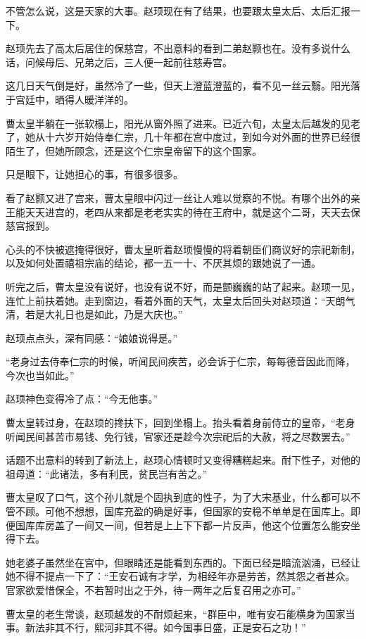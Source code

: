 不管怎么说，这是天家的大事。赵顼现在有了结果，也要跟太皇太后、太后汇报一下。

赵顼先去了高太后居住的保慈宫，不出意料的看到二弟赵颢也在。没有多说什么话，问候母后、兄弟之后，三人便一起前往慈寿宫。

这几日天气倒是好，虽然冷了一些，但天上澄蓝澄蓝的，看不见一丝云翳。阳光落于宫廷中，晒得人暖洋洋的。

曹太皇半躺在一张软榻上，阳光从窗外照了进来。已近六旬，太皇太后越发的见老了，她从十六岁开始侍奉仁宗，几十年都在宫中度过，到如今对外面的世界已经很陌生了，但她所顾念，还是这个仁宗皇帝留下的这个国家。

只是眼下，让她担心的事，有很多很多。

看了赵颢又进了宫来，曹太皇眼中闪过一丝让人难以觉察的不悦。有哪个出外的亲王能天天进宫的，老四从来都是老老实实的待在王府中，就是这个二哥，天天去保慈宫报到。

心头的不快被遮掩得很好，曹太皇听着赵顼慢慢的将着朝臣们商议好的宗祀新制，以及如何处置禧祖宗庙的结论，都一五一十、不厌其烦的跟她说了一通。

听完之后，曹太皇没有说好，也没有说不好，而是颤巍巍的站了起来。赵顼一见，连忙上前扶着她。走到窗边，看着外面的天气，太皇太后回头对赵顼道：“天朗气清，若是大礼日也是如此，乃是大庆也。”

赵顼点点头，深有同感：“娘娘说得是。”

“老身过去侍奉仁宗的时候，听闻民间疾苦，必会诉于仁宗，每每德音因此而降，今次也当如此。”

赵顼神色变得冷了点：“今无他事。”

曹太皇转过身，在赵顼的搀扶下，回到坐榻上。抬头看着身前侍立的皇帝，“老身听闻民间甚苦市易钱、免行钱，官家还是趁今次宗祀后的大赦，将之尽数罢去。”

话题不出意料的转到了新法上，赵顼心情顿时又变得糟糕起来。耐下性子，对他的祖母道：“此诸法，多有利民，贫民岂有苦之。”

曹太皇叹了口气，这个孙儿就是个固执到底的性子，为了大宋基业，什么都可以不管不顾。可他不想想，国库充盈的确是好事，但国家的安稳不单单是在国库上。即便国库库房盖了一间又一间，但若是上上下下都一片反声，他这个位置怎么能安坐得下去。

她老婆子虽然坐在宫中，但眼睛还是能看到东西的。下面已经是暗流汹涌，已经让她不得不提点一下了：“王安石诚有才学，为相经年亦是劳苦，然其怨之者甚众。官家欲爱惜保全，不若暂时出之于外，待一两年之后复召用之亦可。”

曹太皇的老生常谈，赵顼越发的不耐烦起来，“群臣中，唯有安石能横身为国家当事。新法非其不行，熙河非其不得。如今国事日盛，正是安石之功！”


